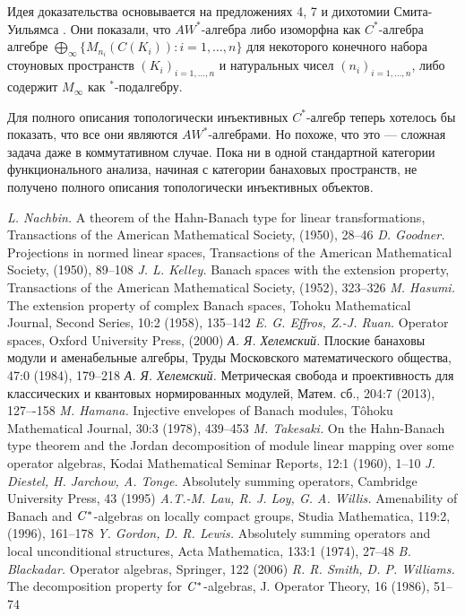\documentclass[12pt]{article}
\begin{document}
\medskip
Идея доказательства основывается на предложениях 4, 7 и дихотомии Смита-Уильямса \cite{SmithDecompPropCStarAlg}. Они показали, что $AW^*$-алгебра либо изоморфна как $C^*$-алгебра алгебре $\bigoplus_\infty\{M_{n_i}(C(K_i)):i=1,\ldots,n\}$ для некоторого конечного набора стоуновых пространств $(K_i)_{i=1,\ldots,n}$ и натуральных чисел $(n_i)_{i=1,\ldots,n}$, либо содержит $M_\infty$ как ${}^*$-подалгебру. 

Для полного описания топологически инъективных $C^*$-алгебр теперь хотелось бы показать, что все они являются $AW^*$-алгебрами. Но похоже, что это --- сложная задача даже в коммутативном случае. Пока ни в одной стандартной категории функционального анализа, начиная с категории банаховых пространств, не получено полного описания топологически инъективных объектов.

\begin{thebibliography}{999}
\textit{L. Nachbin.} A theorem of the Hahn-Banach type for linear transformations, Transactions of the American Mathematical Society, (1950), 28--46
\textit{D. Goodner.} Projections in normed linear spaces, Transactions of the American Mathematical Society, (1950), 89--108
\textit{J. L. Kelley.} Banach spaces with the extension property, Transactions of the American Mathematical Society, (1952), 323--326
\textit{M. Hasumi.} The extension property of complex Banach spaces, Tohoku Mathematical Journal, Second Series, 10:2 (1958), 135--142
\textit{E. G. Effros, Z.-J. Ruan.} Operator spaces, Oxford University Press, (2000)
\textit{А. Я. Хелемский.} Плоские банаховы модули и аменабельные алгебры, Труды Московского математического общества, 47:0 (1984), 179--218
\textit{А. Я. Хелемский.} Метрическая свобода и проективность для классических и квантовых нормированных модулей, Матем. сб., 204:7 (2013), 127–-158 
\textit{M. Hamana.} Injective envelopes of Banach modules, T{\^o}hoku Mathematical Journal, 30:3 (1978), 439--453
\textit{M. Takesaki.} On the Hahn-Banach type theorem and the Jordan decomposition of module linear mapping over some operator algebras, Kodai Mathematical Seminar Reports, 12:1 (1960), 1--10
\textit{J. Diestel, H. Jarchow, A. Tonge.} Absolutely summing operators, Cambridge University Press, 43 (1995)
\textit{A.T.-M. Lau, R. J. Loy, G. A. Willis.} Amenability of Banach and $\it{C^*}$-algebras on locally compact groups, Studia Mathematica, 119:2, (1996), 161--178
\textit{Y. Gordon, D. R. Lewis.} Absolutely summing operators and local unconditional structures, Acta Mathematica, 133:1 (1974), 27--48
\textit{B. Blackadar.} Operator algebras, Springer, 122 (2006)
\textit{R. R. Smith, D. P. Williams.} The decomposition property for $\it{C^*}$-algebras, J. Operator Theory, 16 (1986), 51--74
\end{thebibliography}
\end{document}
